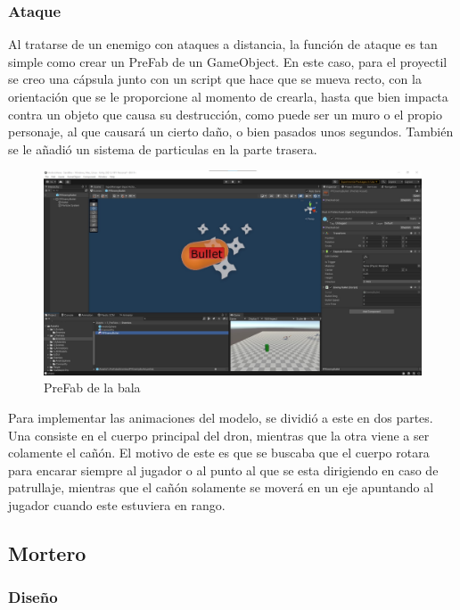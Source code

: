 \documentclass[12pt,spanish]{article}
\begin{document}
\subsubsection{Ataque}

    Al tratarse de un enemigo con ataques a distancia, la función de ataque es tan simple como crear un PreFab de un GameObject. En este caso, para el proyectil se creo una cápsula junto con un script que hace que se mueva recto, con la orientación que se le proporcione al momento de crearla, hasta que bien impacta contra un objeto que causa su destrucción, como puede ser un muro o el propio personaje, al que causará un cierto daño, o bien pasados unos segundos. También se le añadió un sistema de particulas en la parte trasera.

\begin{figure}[h!]
 \centering
 \includegraphics[width = 0.7\linewidth]{enemies/CannonFly/CannonFly_Bullet.jpg}
 \caption{PreFab de la bala}
 \label{fig:t2}
\end{figure}

\newpage

    Para implementar las animaciones del modelo, se dividió a este en dos partes. Una consiste en el cuerpo principal del dron, mientras que la otra viene a ser colamente el cañón. El motivo de este es que se buscaba que el cuerpo rotara para encarar siempre al jugador o al punto al que se esta dirigiendo en caso de patrullaje, mientras que el cañón solamente se moverá en un eje apuntando al jugador cuando este estuviera en rango.

\newpage

\subsection{Mortero}

\subsubsection{Diseño}
\end{document}
